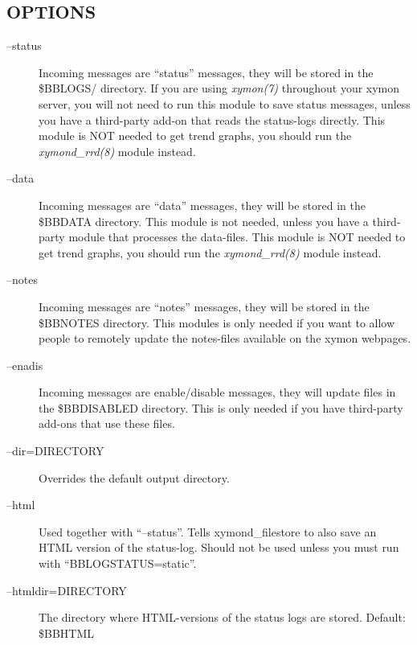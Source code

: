 \subsection{OPTIONS}
\begin{description}
\item[--status] Incoming messages are ``status'' messages, they will be stored in the \$BBLOGS/ directory. If you are using \emph{xymon(7)}
 throughout your xymon server, you will not need to run this module to save status messages, unless you have a third-party add-on that reads the status-logs directly. This module is NOT needed to get trend graphs, you should run the \emph{xymond\_rrd(8)}
 module instead. 

 

\item[--data] Incoming messages are ``data'' messages, they will be stored in the \$BBDATA directory. This module is not needed, unless you have a third-party module that processes the data-files. This module is NOT needed to get trend graphs, you should run the \emph{xymond\_rrd(8)}
 module instead. 

 

\item[--notes] Incoming messages are ``notes'' messages, they will be stored in the \$BBNOTES directory. This modules is only needed if you want to allow people to remotely update the notes-files available on the xymon webpages. 

 

\item[--enadis] Incoming messages are enable/disable messages, they will update files in the \$BBDISABLED directory. This is only needed if you have third-party add-ons that use these files. 

 

\item[--dir=DIRECTORY] Overrides the default output directory. 

 

\item[--html] Used together with ``--status''. Tells xymond\_filestore to also save an HTML version of the status-log. Should not be used unless you must run with ``BBLOGSTATUS=static''. 

 

\item[--htmldir=DIRECTORY] The directory where HTML-versions of the status logs are stored. Default: \$BBHTML 

 


\end{description}
